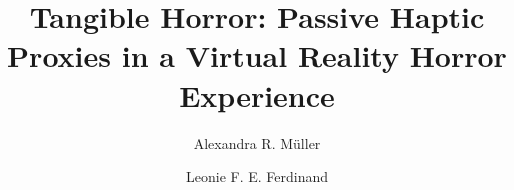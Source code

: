 \documentclass[sigconf,nonacm]{acmart}
\begin{document}
\title[Tangible Horror]{Tangible Horror: Passive Haptic Proxies in a Virtual Reality Horror Experience}

\author{Alexandra R. Müller}

\author{Leonie F. E. Ferdinand}

\begin{abstract}
  
\end{abstract}


\begin{teaserfigure}
  \begin{minipage}[c]{0.325\textwidth}
  \end{minipage}\hfill
  \begin{minipage}[c]{0.325\textwidth}
  \end{minipage}\hfill
  \begin{minipage}[c]{0.325\textwidth}
  \end{minipage}
  \caption{In \emph{Tangible Horror} the player is locked in a cabin (right) and has to discover four coins from four unpleasant hiding places. In the haptic condition each hiding place has a physical counterpart (left) the player reaches into with bare hands, here a bucket of gummy worms standing in for a bucket of maggots (middle).}
  \label{fig:teaser}
\end{teaserfigure}

\maketitle












\end{document}
